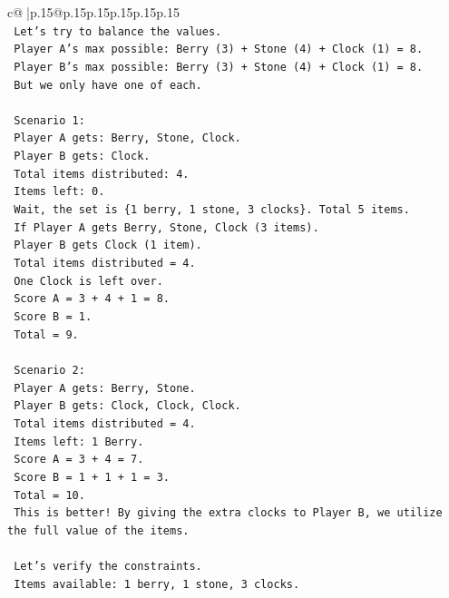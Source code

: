 \documentclass{article}
\begin{document}
{\begin{supertabular}{c@{$\;$}|p{.15\linewidth}@{}p{.15\linewidth}p{.15\linewidth}p{.15\linewidth}p{.15\linewidth}p{.15\linewidth}}
{{{\\ 
\texttt{    Let's try to balance the values.} \\
\texttt{    Player A's max possible: Berry (3) + Stone (4) + Clock (1) = 8.} \\
\texttt{    Player B's max possible: Berry (3) + Stone (4) + Clock (1) = 8.} \\
\texttt{    But we only have one of each.} \\
\\ 
\texttt{    Scenario 1:} \\
\texttt{    Player A gets: Berry, Stone, Clock.} \\
\texttt{    Player B gets: Clock.} \\
\texttt{    Total items distributed: 4.} \\
\texttt{    Items left: 0.} \\
\texttt{    Wait, the set is \{1 berry, 1 stone, 3 clocks\}. Total 5 items.} \\
\texttt{    If Player A gets Berry, Stone, Clock (3 items).} \\
\texttt{    Player B gets Clock (1 item).} \\
\texttt{    Total items distributed = 4.} \\
\texttt{    One Clock is left over.} \\
\texttt{    Score A = 3 + 4 + 1 = 8.} \\
\texttt{    Score B = 1.} \\
\texttt{    Total = 9.} \\
\\ 
\texttt{    Scenario 2:} \\
\texttt{    Player A gets: Berry, Stone.} \\
\texttt{    Player B gets: Clock, Clock, Clock.} \\
\texttt{    Total items distributed = 4.} \\
\texttt{    Items left: 1 Berry.} \\
\texttt{    Score A = 3 + 4 = 7.} \\
\texttt{    Score B = 1 + 1 + 1 = 3.} \\
\texttt{    Total = 10.} \\
\texttt{    This is better! By giving the extra clocks to Player B, we utilize the full value of the items.} \\
\\ 
\texttt{    Let's verify the constraints.} \\
\texttt{    Items available: 1 berry, 1 stone, 3 clocks.} \\
}}}
\end{supertabular}}
\end{document}
